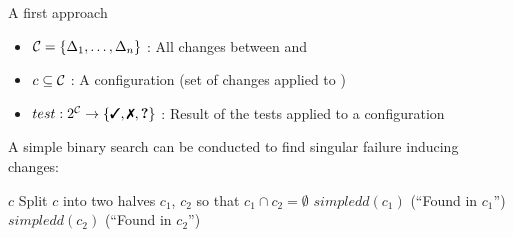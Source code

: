 \begin{frame}{A first approach}
	\begin{itemize}
		\item $\mathcal{C} = \left\{ \Delta_1, \dots, \Delta_n \right\}$ : All changes between \yd and \td
		\item $c \subseteq \mathcal{C}$ : A configuration (set of changes applied to \yd)
		\item $test: 2^{\C} \to \set{\cmark,\xmark,\qmark}$ : Result of the tests applied to a configuration
	\end{itemize}
	
	\pause
	\bigskip

	A simple binary search can be conducted to find singular failure inducing changes:\\[.5em]

	\begin{algorithmic}[1]
			 \Return $c$ \EndIf
			\State Split $c$ into two halves $c_1$, $c_2$ so that $c_1 \cap c_2 = \emptyset$
			 \Return $simpledd(c_1)$ \Comment(``Found in $c_1$'') \Else{} \Return $simpledd(c_2)$ \Comment(``Found in $c_2$'')
			\EndIf
		\EndFunction
	\end{algorithmic}
\end{frame}

